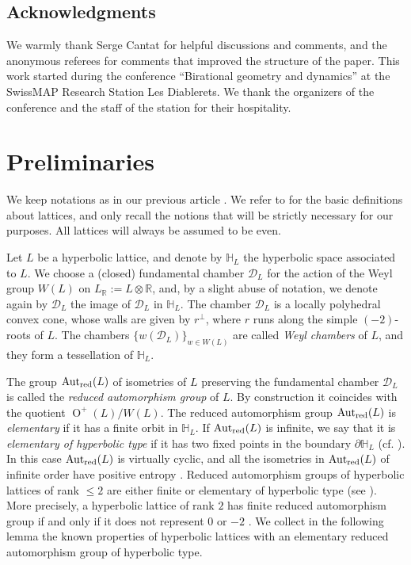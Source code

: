 \documentclass[11pt,letterpaper]{amsart}
\DeclareMathOperator{\Aut}{Aut}
\DeclareMathOperator{\Or}{O}
\newcommand{\RR}{\mathbb{R}}
\newcommand{\HH}{\mathbb{H}}
\newcommand{\AutredL}{\Aut_{\rm red}(L)}
\newcommand{\D}{\mathcal{D}}
\theoremstyle{definition}
\theoremstyle{remark}
\begin{document}
\subsection*{Acknowledgments}
We warmly thank Serge Cantat for helpful discussions and comments, and the anonymous referees for comments that improved the structure of the paper.  This work started during the conference ``Birational geometry and dynamics'' at the SwissMAP Research Station Les Diablerets. We thank the organizers of the conference and the staff of the station for their hospitality.


\section{Preliminaries} \label{sec:preliminaries}

We keep notations as in our previous article \cite{brandhorst.mezzedimi}. We refer to \cite[§2]{brandhorst.mezzedimi} for the basic definitions about lattices, and only recall the notions that will be strictly necessary for our purposes. All lattices will always be assumed to be even.

Let $L$ be a hyperbolic lattice, and denote by $\HH_L$ the hyperbolic space associated to $L$. We choose a (closed) fundamental chamber $\D_L$ for the action of the Weyl group $W(L)$ on $L_\RR:=L \otimes \RR$, and, by a slight abuse of notation, we denote again by $\D_L$ the image of $\D_L$ in $\HH_L$. The chamber $\D_L$ is a locally polyhedral convex cone, whose walls are given by $r^\perp$, where $r$ runs along the simple $(-2)$-roots of $L$. The chambers $\{w(\D_L)\}_{w\in W(L)}$ are called \emph{Weyl chambers} of $L$, and they form a tessellation of $\HH_L$.

The group $\AutredL$ of isometries of $L$ preserving the fundamental chamber $\D_L$ is called the \emph{reduced automorphism group} of $L$. By construction it coincides with the quotient $\Or^+(L)/W(L)$. The reduced automorphism group $\AutredL$ is \emph{elementary} if it has a finite orbit in $\HH_L$. If $\AutredL$ is infinite, we say that it is \emph{elementary of hyperbolic type} if it has two fixed points in the boundary $\partial \HH_L$ (cf. \cite[§5.5]{ratcliffe}). In this case $\AutredL$ is virtually cyclic, and all the isometries in $\AutredL$ of infinite order have positive entropy \cite[Theorem~5.5.8]{ratcliffe}. Reduced automorphism groups of hyperbolic lattices of rank $\le 2$ are either finite or elementary of hyperbolic type (see \cite{galluzzi.lombardo.peters}). More precisely, a hyperbolic lattice of rank $2$ has finite reduced automorphism group if and only if it does not represent $0$ or $-2$ \cite[Corollary~3.4]{galluzzi.lombardo.peters}. We collect in the following lemma the known properties of hyperbolic lattices with an elementary reduced automorphism group of hyperbolic type.
\end{document}
